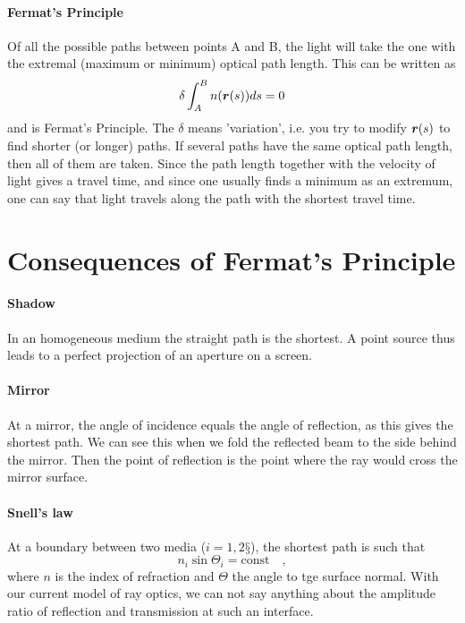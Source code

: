\paragraph*{Fermat's Principle} Of all the possible paths between points A and B, the light will take the one with the extremal (maximum or minimum) optical path length. This can be written as
\begin{equation}
    \delta \int_A^B n(\boldsymbol{r}(s)) ds  = 0
\end{equation}
and is Fermat's Principle. The $\delta$ means 'variation', i.e. you try to modify $\boldsymbol{r}(s)$ to find shorter (or longer) paths. If several paths have the same optical path length, then all of them are taken. Since the path length together with the velocity of light gives a travel time, and since one usually finds a minimum as an extremum, one can say that light travels along the path with the shortest travel time.

\section{Consequences of Fermat's Principle}
  
\paragraph*{Shadow} In an homogeneous medium the straight path is the shortest. A point source thus leads to a perfect projection of an aperture on a screen. 

\paragraph*{Mirror} At a mirror, the angle of incidence equals the angle of reflection, as this gives the shortest path. We can see this when we fold the reflected beam to the side behind the mirror. Then the point of reflection is the point where the ray would cross the mirror surface.


\paragraph*{Snell's law} At a boundary between two media ($i=1,2§$), the shortest path is such  that 
\begin{equation}
    n_i \sin \Theta_i = \text{const} \quad ,
\end{equation}
where $n$ is the index of refraction and $\Theta$ the angle to tge surface normal. With our current model of ray optics, we can not say anything about the amplitude ratio of reflection and transmission at such an interface.


